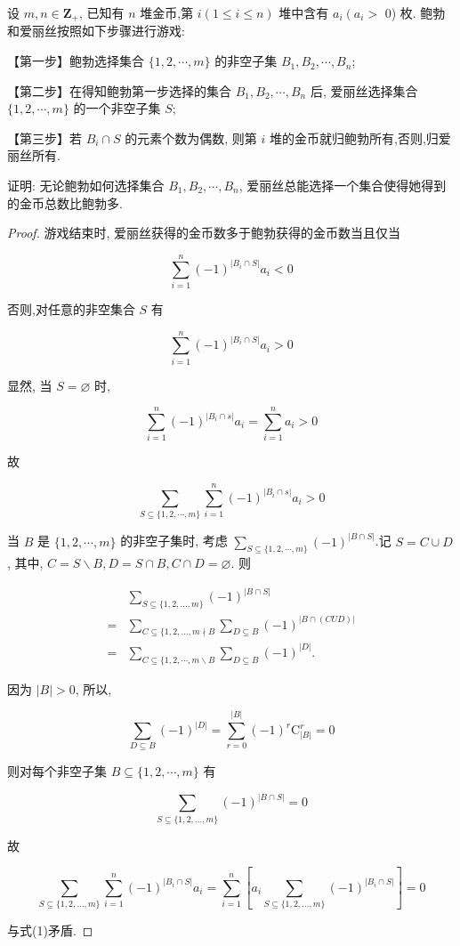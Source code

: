 \begin{example}
	设 $m, n \in \mathbf{Z}_{+}$, 已知有 $n$ 堆金币,第 $i(1 \leqslant i \leqslant n)$ 堆中含有 $a_{i}\left(a_{i}>\right.$ 0) 枚. 鲍勃和爱丽丝按照如下步骤进行游戏:

		【第一步】鲍勃选择集合 $\{1,2, \cdots, m\}$ 的非空子集 $B_{1}, B_{2}, \cdots, B_{n}$;

		【第二步】在得知鲍勃第一步选择的集合 $B_{1}, B_{2}, \cdots, B_{n}$ 后, 爱丽丝选择集合 $\{1,2, \cdots, m\}$ 的一个非空子集 $S ;$

		【第三步】若 $B_{i} \cap S$ 的元素个数为偶数, 则第 $i$ 堆的金币就归鲍勃所有,否则,归爱丽丝所有.

		证明: 无论鲍勃如何选择集合 $B_{1}, B_{2}, \cdots, B_{n}$, 爱丽丝总能选择一个集合使得她得到的金币总数比鲍勃多.
\end{example}

\begin{proof}
	游戏结束时, 爱丽丝获得的金币数多于鲍勃获得的金币数当且仅当

	$$
		\sum_{i=1}^{n}(-1)^{\left|B_{i} \cap S\right|} a_{i}<0
	$$

	否则,对任意的非空集合 $S$ 有

	$$
		\sum_{i=1}^{n}(-1)^{\left|B_{i} \cap S\right|} a_{i}>0
	$$

	显然, 当 $S=\varnothing$ 时,

	$$
		\sum_{i=1}^{n}(-1)^{\left|B_{i} \cap s\right|} a_{i}=\sum_{i=1}^{n} a_{i}>0
	$$

	故


	\begin{equation*}
		\sum_{S \subseteq\{1,2, \cdots, m\}} \sum_{i=1}^{n}(-1)^{\left|B_{i} \cap s\right|} a_{i}>0 \tag{1}
	\end{equation*}


	当 $B$ 是 $\{1,2, \cdots, m\}$ 的非空子集时, 考虑 $\sum_{S \subseteq\{1,2, \cdots, m\}}(-1)^{|B \cap S|}$.记 $S=C \cup D$, 其中, $C=S \backslash B, D=S \cap B, C \cap D=\varnothing$. 则

	$$
		\begin{aligned}
			  & \sum_{S \subseteq\{1,2, \ldots, m\}}(-1)^{|B \cap S|}                                 \\
			= & \sum_{C \subseteq\{1,2, \ldots, m \nmid B} \sum_{D \subseteq B}(-1)^{|B \cap(C U D)|} \\
			= & \sum_{C \subseteq\{1,2, \cdots, m \backslash B} \sum_{D \subseteq B}(-1)^{|D|} .
		\end{aligned}
	$$

	因为 $|B|>0$, 所以,

	$$
		\sum_{D \subseteq B}(-1)^{|D|}=\sum_{r=0}^{|B|}(-1)^{r} \mathrm{C}_{|B|}^{r}=0
	$$

	则对每个非空子集 $B \subseteq\{1,2, \cdots, m\}$ 有

	$$
		\sum_{S \subseteq\{1,2, \ldots, m\}}(-1)^{|B \cap S|}=0
	$$

	故

	$$
		\sum_{S \subseteq\{1,2, \ldots, m\}} \sum_{i=1}^{n}(-1)^{\left|B_{i} \cap S\right|} a_{i}=\sum_{i=1}^{n}\left[a_{i} \sum_{S \subseteq\{1,2, \ldots, m\}}(-1)^{\left|B_{i} \cap S\right|}\right]=0
	$$

	与式(1)矛盾.
\end{proof}

